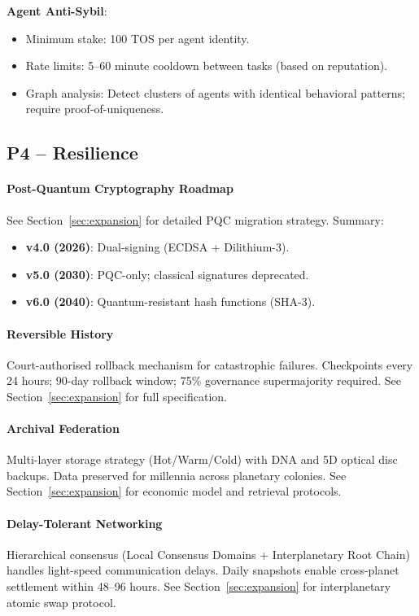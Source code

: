\documentclass[11pt]{article}
\begin{document}
\textbf{Agent Anti-Sybil}:
\begin{itemize}[noitemsep]
  \item Minimum stake: 100 TOS per agent identity.
  \item Rate limits: 5--60 minute cooldown between tasks (based on reputation).
  \item Graph analysis: Detect clusters of agents with identical behavioral patterns; require proof-of-uniqueness.
\end{itemize}

\subsection{P4 -- Resilience}
\label{sec:pillar-resilience}

\paragraph{Post-Quantum Cryptography Roadmap}
See Section~\ref{sec:expansion} for detailed PQC migration strategy. Summary:
\begin{itemize}[noitemsep]
  \item \textbf{v4.0 (2026)}: Dual-signing (ECDSA + Dilithium-3).
  \item \textbf{v5.0 (2030)}: PQC-only; classical signatures deprecated.
  \item \textbf{v6.0 (2040)}: Quantum-resistant hash functions (SHA-3).
\end{itemize}

\paragraph{Reversible History}
Court-authorised rollback mechanism for catastrophic failures. Checkpoints every 24 hours; 90-day rollback window; 75\% governance supermajority required. See Section~\ref{sec:expansion} for full specification.

\paragraph{Archival Federation}
Multi-layer storage strategy (Hot/Warm/Cold) with DNA and 5D optical disc backups. Data preserved for millennia across planetary colonies. See Section~\ref{sec:expansion} for economic model and retrieval protocols.

\paragraph{Delay-Tolerant Networking}
Hierarchical consensus (Local Consensus Domains + Interplanetary Root Chain) handles light-speed communication delays. Daily snapshots enable cross-planet settlement within 48--96 hours. See Section~\ref{sec:expansion} for interplanetary atomic swap protocol.
\end{document}
